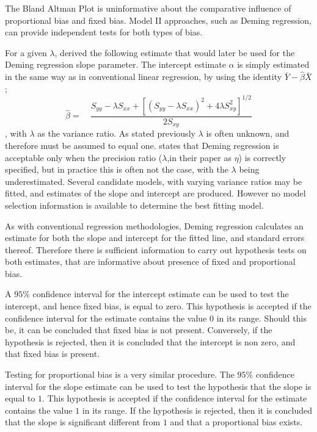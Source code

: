 \documentclass[12pt, a4paper]{report}
\theoremstyle{plain}
\theoremstyle{definition}
\theoremstyle{remark}
\begin{document}
		The Bland Altman Plot is
		uninformative about the comparative influence of proportional bias
		and fixed bias. Model II approaches, such as Deming regression,  can provide independent tests for
		both types of bias.
		
		For a given $\lambda$, \citet{Kummel} derived the following
		estimate that would later be used for the Deming regression slope
		parameter. The intercept estimate $\alpha$
		is simply estimated in the same way as in conventional linear
		regression, by using the identity $\bar{Y}-\hat{\beta}\bar{X}$;
		\begin{equation}
		\hat{\beta} =\quad \frac{S_{yy} - \lambda S_{xx}+[(S_{yy} -
			\lambda S_{xx})^{2}+ 4\lambda S^{2}_{xy}]^{1/2}}{2S_{xy}}
		\end{equation},
		with $\lambda$ as the variance ratio. As stated previously $\lambda$ is often unknown, and therefore must be assumed to equal one. \citet{CarollRupert} states that Deming
		regression is acceptable only when the precision ratio ($\lambda$,in their paper as $\eta$) is correctly specified, but in practice this is often not the case, with the $\lambda$ being underestimated. Several candidate models, with varying variance ratios may be fitted, and estimates of the slope and intercept are produced. However no model selection information is available to determine the best fitting model.
		
		As with conventional regression methodologies, Deming regression
		calculates an estimate for both the slope and intercept for the
		fitted line, and standard errors thereof. Therefore there is
		sufficient information to carry out hypothesis tests on both
		estimates, that are informative about presence of fixed and
		proportional bias.
		
		A $95\%$ confidence interval for the intercept estimate can be
		used to test the intercept, and hence fixed bias, is equal to
		zero. This hypothesis is accepted if the confidence interval for
		the estimate contains the value $0$ in its range. Should this be,
		it can be concluded that fixed bias is not present. Conversely, if
		the hypothesis is rejected, then it is concluded that the
		intercept is non zero, and that fixed bias is present.
		
		Testing for proportional bias is a very similar procedure. The
		$95\%$ confidence interval for the slope estimate can be used to
		test the hypothesis that the slope is equal to $1$. This
		hypothesis is accepted if the confidence interval for the estimate
		contains the value $1$ in its range. If the hypothesis is
		rejected, then it is concluded that the slope is significant
		different from $1$ and that a proportional bias exists.
		
\end{document}
